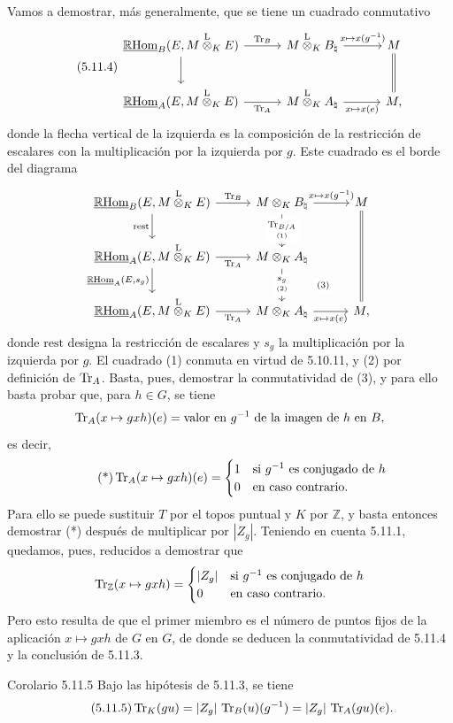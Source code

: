 Vamos a demostrar, más generalmente, que se tiene un cuadrado conmutativo
\begin{equation}\tag{5.11.4}
\begin{tikzcd}[column sep=3.0em,row sep=2.2em]
\uRHom_B(E,M\lten_KE) \arrow[r,"\Tr_B"] \arrow[d] &
M\lten_KB_\natural \arrow[r,"{x\mapsto x(g^{-1})}"] &
M \arrow[d,equal] \\
\uRHom_A(E,M\lten_KE) \arrow[r,"\Tr_A"'] &
M\lten_KA_\natural \arrow[r,"{x\mapsto x(e)}"'] &
M,
\end{tikzcd}
\end{equation}
donde la flecha vertical de la izquierda es la composición de la restricción de escalares con la multiplicación por la izquierda por $g$. Este cuadrado es el borde del diagrama
\[
\begin{tikzcd}[column sep=2.8em,row sep=2.0em]
\uRHom_B(E,M\lten_KE) \arrow[r,"\Tr_B"] \arrow[d,"\mathrm{rest}"'] &
M\otimes_KB_\natural \arrow[r,"{x\mapsto x(g^{-1})}"] \arrow[d,"{\underset{(1)}{\Tr_{B/A}}}" description] &
M \arrow[dd,equal] \\
\uRHom_A(E,M\lten_KE) \arrow[r,"\Tr_A"'] \arrow[d,"{\uRHom_A(E,s_g)}"'] &
M\otimes_KA_\natural \arrow[d,"{\underset{(2)}{s_g}}" description] \arrow[dr,phantom,"\scriptstyle(3)" description] &
\\
\uRHom_A(E,M\lten_KE) \arrow[r,"\Tr_A"'] &
M\otimes_KA_\natural \arrow[r,"{x\mapsto x(e)}"'] &
M,
\end{tikzcd}
\]
donde $\mathrm{rest}$ designa la restricción de escalares y $s_g$ la multiplicación por la izquierda por $g$. El cuadrado (1) conmuta en virtud de 5.10.11, y (2) por definición de $\operatorname{Tr}_A$. Basta, pues, demostrar la conmutatividad de (3), y para ello basta probar que, para $h\in G$, se tiene
\[
\operatorname{Tr}_A(x\mapsto gxh)(e)=\text{valor en }g^{-1}\text{ de la imagen de }h\text{ en }B,
\]
es decir,
\begin{equation}\tag{*}
\operatorname{Tr}_A(x\mapsto gxh)(e)=
\begin{cases}
1 & \text{si } g^{-1}\text{ es conjugado de }h\\
0 & \text{en caso contrario}.
\end{cases}
\end{equation}
Para ello se puede sustituir $T$ por el topos puntual y $K$ por $\mathbb Z$, y basta entonces demostrar (*) después de multiplicar por $|Z_g|$. Teniendo en cuenta 5.11.1, quedamos, pues, reducidos a demostrar que
\[
\operatorname{Tr}_{\mathbb Z}(x\mapsto gxh)=
\begin{cases}
|Z_g| & \text{si } g^{-1}\text{ es conjugado de }h\\
0 & \text{en caso contrario}.
\end{cases}
\]
Pero esto resulta de que el primer miembro es el número de puntos fijos de la aplicación $x\mapsto gxh$ de $G$ en $G$, de donde se deducen la conmutatividad de 5.11.4 y la conclusión de 5.11.3.

\begin{statement}{Corolario 5.11.5}
Bajo las hipótesis de 5.11.3, se tiene
\begin{equation}\tag{5.11.5}
\operatorname{Tr}_K(gu)=|Z_g|\,\operatorname{Tr}_B(u)(g^{-1})=|Z_g|\,\operatorname{Tr}_A(gu)(e).
\end{equation}
\end{statement}
